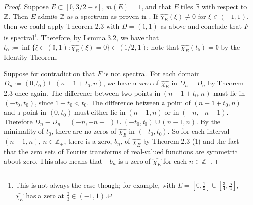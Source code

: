 \documentclass{amsart}
\begin{document}
\begin{proof}
    Suppose $E\subset[0,3/2-\epsilon]$, $m(E)=1$, and that $E$ tiles $\mathbb{R}$ with respect to $\mathbb{Z}$. Then $E$ admits $\mathbb{Z}$ as a spectrum as proven in \cite{Fug74}. If $\hat{\chi_E}(\xi)\neq 0$ for $\xi\in (-1,1)$, then we could apply Theorem 2.3 with $D=(0,1)$ as above and conclude that $F$ is spectral\footnote{This is not always the case though; for example, with $E = [0, \frac12] \cup [\frac34, \frac54]$, $\hat{\chi_E}$ has a zero at $\frac23 \in (-1,1)$.}. Therefore, by Lemma 3.2, we have that $t_0:=\inf\{\xi\in (0,1):\hat{\chi_E}(\xi)=0\}\in (1/2,1)$; note that $\hat{\chi_E}(t_0)=0$ by the Identity Theorem. 
    
    Suppose for contradiction that $F$ is not spectral. For each domain $D_n:=(0,t_0)\cup(n-1+t_0,n)$, we have a zero of $\hat{\chi_E}$ in $D_n-D_n$ by Theorem 2.3 once again. The difference between two points in $(n-1+t_0,n)$ must lie in $(-t_0,t_0)$, since $1-t_0<t_0$. The difference between a point of $(n-1+t_0,n)$ and a point in $(0,t_0)$ must either lie in $(n-1,n)$ or in $(-n,-n+1)$. Therefore $D_n-D_n=(-n,-n+1)\cup(-t_0,t_0)\cup (n-1,n)$. By the minimality of $t_0$, there are no zeros of $\hat{\chi_E}$ in $(-t_0,t_0)$. So for each interval $(n-1,n)$, $n\in\mathbb{Z}_+$, there is a zero, $b_n$, of $\hat{\chi_E}$ by Theorem 2.3 (1) and the fact that the zero sets of Fourier transforms of real-valued functions are symmetric about zero. This also means that $-b_n$ is a zero of $\hat{\chi_E}$ for each $n\in\mathbb{Z}_+$.


\end{proof}
\end{document}

